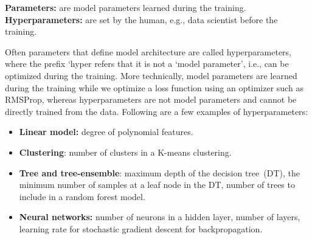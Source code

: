 \vspace{-1mm}
\begin{tcolorbox}[colback=white!3!white,colframe=gray!120!black,title=\faBook~Model parameters vs. hyperparameters]
    \scriptsize{
        \textbf{Parameters:} are model parameters learned during the training. \\
        \textbf{Hyperparameters:} are set by the human, e.g., data scientist before the training.
        }
\end{tcolorbox}

\hspace*{3.5mm} Often parameters that define model architecture are called hyperparameters, where the prefix `hyper refers that it is not a `model parameter', i.e., can be optimized during the training. More technically, model parameters are learned during the training while we optimize a loss function using an optimizer such as RMSProp, whereas hyperparameters are not model parameters and cannot be directly trained from the data. Following are a few examples of hyperparameters: 

\vspace{-1mm}
\begin{itemize}[noitemsep]
    \item \textbf{Linear model:} degree of polynomial features.
    \item \textbf{Clustering}: number of clusters in a K-means clustering.
    \item \textbf{Tree and tree-ensemble}: maximum depth of the decision tree~(DT), the minimum number of samples at a leaf node in the DT, number of trees to include in a random forest model. 
    \item \textbf{Neural networks:} number of neurons in a hidden layer, number of layers, learning rate for stochastic gradient descent for backpropagation. 
\end{itemize} 
\vspace{-2mm}

